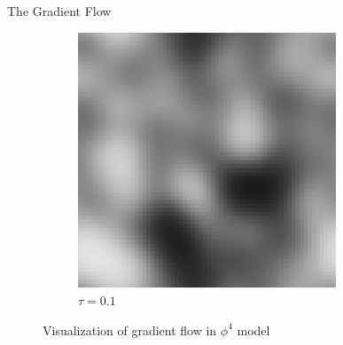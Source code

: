 \documentclass[18pt]{beamer}
\begin{document}
\begin{frame}{}
\begin{columns}[t]
\begin{column}{0.32\linewidth}
\begin{block}{The Gradient Flow}
\begin{figure}[h]
              \begin{subfigure}[b]{\Width}\centering
                \includegraphics[width=0.9\textwidth]{gf3.png}
                \caption{$\tau=0.1$}
              \end{subfigure}%
              \caption{\label{fig:flow} Visualization of gradient flow in $\phi^4$ model}
        \end{figure}
        \end{block}
    \end{column}%
    \begin{column}{0.32\linewidth}


\end{column}
\end{columns}
\end{frame}
\end{document}
